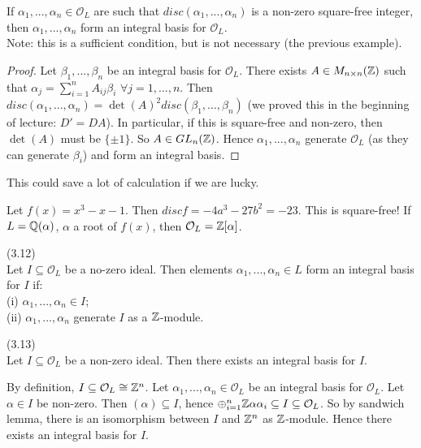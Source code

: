 \documentclass[a4paper]{article}
\begin{document}
\begin{prop}
If $\alpha_1,...,\alpha_n \in \mathcal{O}_L$ are such that $disc(\alpha_1,...,\alpha_n)$ is a non-zero square-free integer, then $\alpha_1,...,\alpha_n$ form an integral basis for $\mathcal{O}_L$.\\
Note: this is a sufficient condition, but is not necessary (the previous example).\\
\begin{proof}
Let $\beta_1,...,\beta_n$ be an integral basis for $\mathcal{O}_L$. There exists $A \in M_{n \times n} (\mathbb{Z})$ such that $\alpha_j = \sum_{i=1}^n A_{ij} \beta_i$ $\forall j = 1,...,n$. Then $disc(\alpha_1,...,\alpha_n) = \det(A)^2 disc(\beta_1,...,\beta_n)$ (we proved this in the beginning of lecture: $D'=DA$). In particular, if this is square-free and non-zero, then $\det(A)$ must be $\{\pm 1\}$. So $A \in GL_n(\mathbb{Z})$. Hence $\alpha_1,...,\alpha_n$ generate $\mathcal{O}_L$ (as they can generate $\beta_i$) and form an integral basis.
\end{proof}
\end{prop}

This could save a lot of calculation if we are lucky.
\begin{eg}
Let $f(x) = x^3-x-1$. Then $disc f = -4a^3 - 27b^2 = -23$. This is square-free! If $L=\mathbb{Q}(\alpha)$, $\alpha$ a root of $f(x)$, then $\mathcal{O}_L = \mathbb{Z}[\alpha]$.
\end{eg}

\begin{defi} (3.12)\\
Let $I \subseteq \mathcal{O}_L$ be a no-zero ideal. Then elements $\alpha_1,...,\alpha_n \in L$ form an integral basis for $I$ if:\\
(i) $\alpha_1,...,\alpha_n \in I$;\\
(ii) $\alpha_1,...,\alpha_n$ generate $I$ as a $\mathbb{Z}$-module.
\end{defi}

\begin{prop} (3.13)\\
Let $I \subseteq \mathcal{O}_L$ be a non-zero ideal. Then there exists an integral basis for $I$.
\begin{defi}
By definition, $I \subseteq \mathcal{O}_L \cong \mathbb{Z}^n$. Let $\alpha_1,...,\alpha_n \in \mathcal{O}_L$ be an integral basis for $\mathcal{O}_L$. Let $\alpha \in I$ be non-zero. Then $(\alpha)\subseteq I$, hence $\oplus_{i=1}^n \mathbb{Z} \alpha \alpha_i \subseteq I \subseteq \mathcal{O}_L$. So by sandwich lemma, there is an isomorphism between $I$ and $\mathbb{Z}^n$ as $\mathbb{Z}$-module. Hence there exists an integral basis for $I$.
\end{defi}
\end{prop}
\end{document}
